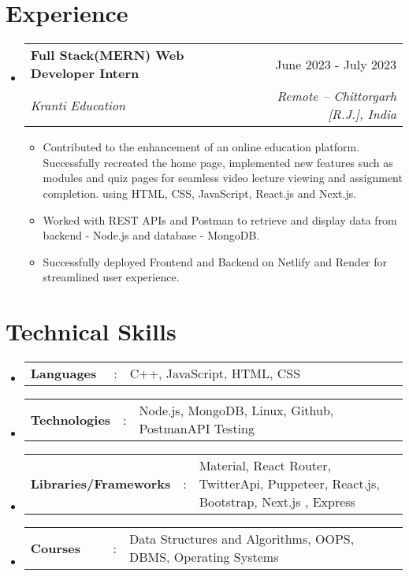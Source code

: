 \documentclass[a4paper,11pt]{article}
\makeatletter
\newcommand{\resumeItem}[1]{
  \item\small{#1}
}
\newcommand{\resumeItemListStart}{\begin{itemize}[rightmargin=0.11in]}
\newcommand{\resumeItemListEnd}{\end{itemize}}
\newcommand{\resumeSectionType}[3]{
  \item\begin{tabular*}{0.96\textwidth}[t]{
    p{0.22\linewidth}p{0.02\linewidth}p{0.8\linewidth}
  }
    \textbf{#1} & #2 & #3
  \end{tabular*}\vspace{-7pt}
}
\newcommand{\resumeQuadHeading}[4]{
  \item
  \begin{tabular*}{0.96\textwidth}[t]{l@{\extracolsep{\fill}}r}
    \textbf{#1} & #2 \\
    \textit{\small#3} & \textit{\small #4} \\
  \end{tabular*}
}
\newcommand{\resumeHeadingListStart}{
  \begin{itemize}[leftmargin=0.15in, label={}]
}
\newcommand{\resumeHeadingListEnd}{\end{itemize}}
\makeatother
\begin{document}
\section{Experience}
\resumeHeadingListStart{}
  \resumeQuadHeading{Full Stack(MERN) Web Developer Intern}{June 2023 - July 2023}
  {Kranti Education}{Remote -- Chittorgarh [R.J.], India}
    \resumeItemListStart{}
      \resumeItem{Contributed to the enhancement of an online education platform. Successfully recreated the home page, implemented new features such as modules and quiz pages for seamless video lecture viewing and assignment completion. using HTML, CSS, JavaScript, React.js and Next.js.}
      \resumeItem{Worked with REST APIs and Postman to retrieve and display data from backend - Node.js and database - MongoDB.}
      \resumeItem{Successfully deployed Frontend and Backend on Netlify and Render for streamlined user experience. }
    \resumeItemListEnd{}
\resumeHeadingListEnd{}



\section{Technical Skills}
  \resumeHeadingListStart{}
    \resumeSectionType{Languages}{:}{C++, JavaScript, HTML, CSS}
    \resumeSectionType{Technologies}{:}{Node.js, MongoDB, Linux, Github, PostmanAPI Testing}
    \resumeSectionType{Libraries/Frameworks}{:}{Material, React Router, TwitterApi, Puppeteer, React.js, Bootstrap, Next.js , Express}
    \resumeSectionType{Courses}{:}{Data Structures and Algorithms, OOPS, DBMS, Operating Systems}
  \resumeHeadingListEnd{}



\end{document}
